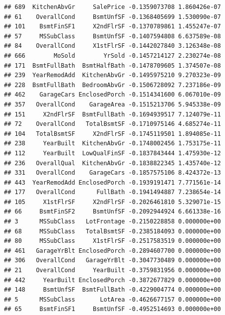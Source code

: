 \documentclass[american,]{article}
\theoremstyle{definition}
\theoremstyle{definition}
\theoremstyle{definition}
\theoremstyle{remark}
\begin{document}
\begin{verbatim}
## 689  KitchenAbvGr     SalePrice -0.1359073708 1.860426e-07
## 61    OverallCond     BsmtUnfSF -0.1368405699 1.530090e-07
## 101    BsmtFinSF1     X2ndFlrSF -0.1370789861 1.455247e-07
## 57     MSSubClass     BsmtUnfSF -0.1407594808 6.637589e-08
## 84    OverallCond     X1stFlrSF -0.1442027840 3.126348e-08
## 666        MoSold        YrSold -0.1457214127 2.230274e-08
## 171  BsmtFullBath  BsmtHalfBath -0.1478709605 1.374507e-08
## 239  YearRemodAdd  KitchenAbvGr -0.1495975210 9.270323e-09
## 228  BsmtFullBath  BedroomAbvGr -0.1506728092 7.237186e-09
## 462    GarageCars EnclosedPorch -0.1514341600 6.067010e-09
## 357   OverallCond    GarageArea -0.1515213706 5.945338e-09
## 151     X2ndFlrSF  BsmtFullBath -0.1694939517 7.124079e-11
## 72    OverallCond   TotalBsmtSF -0.1710975146 4.685274e-11
## 104   TotalBsmtSF     X2ndFlrSF -0.1745119501 1.894085e-11
## 238     YearBuilt  KitchenAbvGr -0.1748002456 1.753175e-11
## 112     YearBuilt  LowQualFinSF -0.1837843444 1.475930e-12
## 236   OverallQual  KitchenAbvGr -0.1838822345 1.435740e-12
## 331   OverallCond    GarageCars -0.1857575106 8.424372e-13
## 443  YearRemodAdd EnclosedPorch -0.1939191471 7.771561e-14
## 177   OverallCond      FullBath -0.1941494887 7.238654e-14
## 105     X1stFlrSF     X2ndFlrSF -0.2026461810 5.329071e-15
## 66     BsmtFinSF2     BsmtUnfSF -0.2092944924 6.661338e-16
## 3      MSSubClass   LotFrontage -0.2150228858 0.000000e+00
## 68     MSSubClass   TotalBsmtSF -0.2385184093 0.000000e+00
## 80     MSSubClass     X1stFlrSF -0.2517583519 0.000000e+00
## 461   GarageYrBlt EnclosedPorch -0.2894607700 0.000000e+00
## 306   OverallCond   GarageYrBlt -0.3047730489 0.000000e+00
## 21    OverallCond     YearBuilt -0.3759831956 0.000000e+00
## 442     YearBuilt EnclosedPorch -0.3872677829 0.000000e+00
## 148     BsmtUnfSF  BsmtFullBath -0.4229004774 0.000000e+00
## 5      MSSubClass       LotArea -0.4626677157 0.000000e+00
## 65     BsmtFinSF1     BsmtUnfSF -0.4952514693 0.000000e+00
\end{verbatim}
\end{document}
